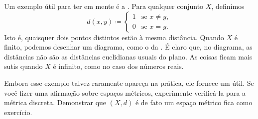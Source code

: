 \begin{example}
Um exemplo útil para ter em mente é a \emph{}.
Para qualquer conjunto $X$, definimos
\begin{equation*}
d(x,y) \coloneqq
\begin{cases}
1 & \text{se } x \neq y, \\
0 & \text{se } x = y.
\end{cases}
\end{equation*}
Isto é, quaisquer dois pontos distintos estão à mesma distância. Quando $X$
é finito, podemos desenhar um diagrama, como o da .
É claro que, no diagrama, as distâncias não são as distâncias euclidianas
usuais do plano.
As coisas ficam mais sutis quando $X$ é infinito, como no caso dos números
reais.
\begin{myfigureht}
\caption{Exemplo de espaço métrico discreto $\{ a,b,c,d,e \}$: a distância
entre quaisquer dois pontos distintos é $1$.\label{fig:msdiscmetric}}
\end{myfigureht}

Embora esse exemplo talvez raramente apareça na prática, ele fornece um
 útil. Se você fizer uma afirmação sobre
espaços métricos, experimente verificá-la para a métrica discreta.
Demonstrar que $(X,d)$ é de fato um espaço métrico fica como exercício.
\end{example}

